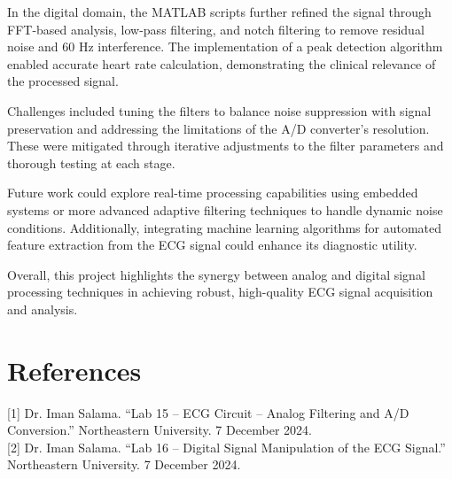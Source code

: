 \documentclass[11pt]{article}
\begin{document}
In the digital domain, the MATLAB scripts further refined the signal through FFT-based analysis, low-pass filtering, and
notch filtering to remove residual noise and 60 Hz interference. The implementation of a peak detection algorithm enabled
accurate heart rate calculation, demonstrating the clinical relevance of the processed signal.

Challenges included tuning the filters to balance noise suppression with signal preservation and addressing the limitations
of the A/D converter's resolution. These were mitigated through iterative adjustments to the filter parameters and thorough
testing at each stage.

Future work could explore real-time processing capabilities using embedded systems or more advanced adaptive filtering
techniques to handle dynamic noise conditions. Additionally, integrating machine learning algorithms for automated feature
extraction from the ECG signal could enhance its diagnostic utility.

Overall, this project highlights the synergy between analog and digital signal processing techniques in achieving robust,
high-quality ECG signal acquisition and analysis.
\section{References}
[1] Dr. Iman Salama. “Lab 15 – ECG Circuit – Analog Filtering and A/D Conversion.” Northeastern University. 7 December 2024.\\

[2] Dr. Iman Salama. “Lab 16 – Digital Signal Manipulation of the ECG Signal.” Northeastern University. 7 December 2024.
\end{document}
